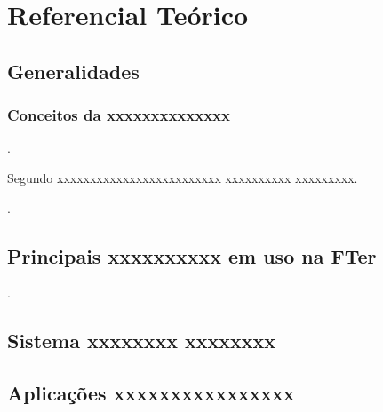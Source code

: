 \chapter{Referencial Teórico}
\noindent
\lipsum[15]

\section{Generalidades}

\lipsum[16]

\subsection{Conceitos da xxxxxxxxxxxxxx}

\begin{citacao}
    \lipsum[17] \cite{DoutrinaMilitarTerrestre54}.
\end{citacao}

Segundo  xxxxxxxxxxxxxxxxxxxxxxxxx xxxxxxxxxx xxxxxxxxx.

\begin{citacao}
    \lipsum[18] \cite{DoutrinaMilitarTerrestre54}.
\end{citacao}

\lipsum[19]



\section{Principais xxxxxxxxxx em uso na FTer}
\lipsum[20-23] \cite{LivroBrancodeDefesaNacional455,EstruturaMilitardeDefesa454}.


\section{Sistema xxxxxxxx xxxxxxxx}

\lipsum[7]


\section{Aplicações xxxxxxxxxxxxxxxx}

\lipsum[24]

